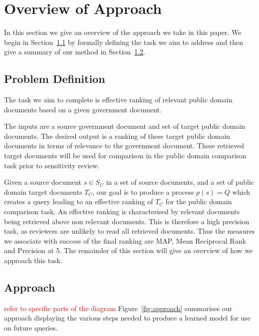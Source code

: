 \documentclass{mpaper}
\newcommand{\remove}[1]{\textcolor{red}{#1}}
\begin{document}
\section{Overview of Approach} \label{sec:overview}
In this section we give an overview of the approach we take in this paper.
We begin in Section~\ref{sec:overview.probdef} by formally defining the task we aim to address and then give a summary of our method in Section~\ref{sec:overview.approach}.

\subsection{Problem Definition} \label{sec:overview.probdef}
The task we aim to complete is effective ranking of relevant public domain documents based on a given government document.

The inputs are a source government document and set of target public domain documents.
The desired output is a ranking of these target public domain documents in terms of relevance to the government document. These retrieved target documents will be used for comparison in the public domain comparison task prior to sensitivity review.

Given a source document $s \in S_C$ in a set of source documents, and a set of public domain target documents $T_C$, our goal is to produce a process $p(s) = Q$ which creates a query leading to an effective ranking of $T_C$ for the public domain comparison task.
An effective ranking is characterised by relevant documents being retrieved above non relevant documents. This is therefore a high precision task, as reviewers are unlikely to read all retrieved documents. Thus the measures we associate with success of the final ranking are MAP, Mean Reciprocal Rank and Precision at 5.
The remainder of this section will give an overview of how we approach this task. 

\subsection{Approach} \label{sec:overview.approach}
\remove{refer to specific parts of the diagram}
Figure~\ref{fig:approach} summarises our approach displaying the various steps needed to produce a learned model for use on future queries.
\end{document}
